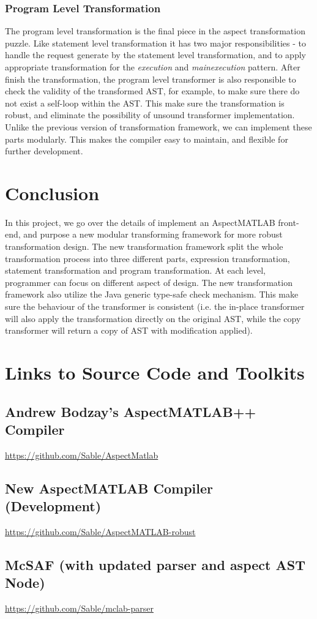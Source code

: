 \documentclass{comp621}
\begin{document}
\subsubsection{Program Level Transformation}
The program level transformation is the final piece in the aspect
transformation puzzle. Like statement level transformation it has two major
responsibilities - to handle the request generate by the statement level
transformation, and to apply appropriate transformation for the
\emph{execution} and \emph{mainexecution} pattern. After finish the
transformation, the program level transformer is also responsible to check the
validity of the transformed AST, for example, to make sure there do not exist a
self-loop within the AST. This make sure the transformation is robust, and
eliminate the possibility of unsound transformer implementation. Unlike the
previous version of transformation framework, we can implement these
parts modularly. This makes the compiler easy to maintain, and flexible for
further development.

\section{Conclusion}

In this project, we go over the details of implement an AspectMATLAB
front-end, and purpose a new modular transforming framework for more robust
transformation design. The new transformation framework split the whole
transformation process into three different parts, expression transformation,
statement transformation and program transformation. At each level, programmer
can focus on different aspect of design. The new transformation framework also
utilize the Java generic type-safe check mechanism. This make sure the
behaviour of the transformer is consistent (i.e. the in-place transformer will
also apply the transformation directly on the original AST, while the copy
transformer will return a copy of AST with modification applied).

\pagebreak
\appendix
\section{Links to Source Code and Toolkits}
\subsection{Andrew Bodzay's AspectMATLAB++ Compiler}
\url{https://github.com/Sable/AspectMatlab}
\subsection{New AspectMATLAB Compiler (Development)}
\url{https://github.com/Sable/AspectMATLAB-robust}
\subsection{McSAF (with updated parser and aspect AST Node)}
\url{https://github.com/Sable/mclab-parser}
\pagebreak




\end{document}
